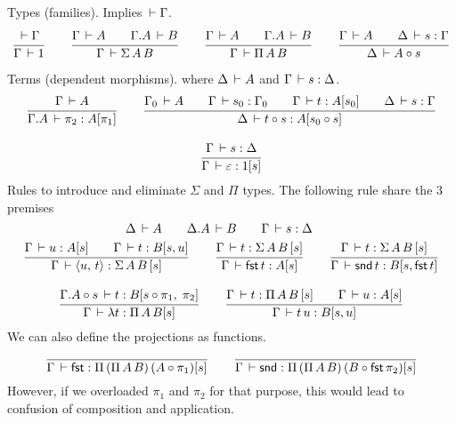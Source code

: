 \documentclass{article}
\newcommand{\pair}[2]{\langle#1,\,#2\rangle}
\newcommand{\eps}{\varepsilon}
\newcommand{\emp}{\eps}
\newcommand{\SigT}[2]{\Sigma\,#1\,#2}
\renewcommand{\PiT}[2]{\Pi\,#1\,#2}
\begin{document}
Types (families).   Implies $\,\vdash \Gamma$.
\begin{gather*}
  \ru{\der \Gamma
    }{\Gamma \der 1}
\qquad
  \ru{\Gamma \der A \qquad
      \cext \Gamma A \der B
    }{\Gamma \der \SigT A B}
\qquad
  \ru{\Gamma \der A \qquad
      \cext \Gamma A \der B
    }{\Gamma \der \PiT A B}
\qquad
  \ru{\Gamma \der A \qquad \Delta \der s : \Gamma
    }{\Delta \der A \comp s}
\end{gather*}

Terms (dependent morphisms).  where
$\Delta \,\vdash A$ and $\Gamma \,\vdash s : \Delta$.
\begin{gather*}
  \ru{\Gamma \der A
    }{\cext \Gamma A \der \pi_2 : A [\pi_1]}
\qquad
  \ru{\Gamma_0 \der A \qquad
      \Gamma \der s_0 : \Gamma_0 \qquad
      \Gamma \der t : A[s_0]   \qquad
      \Delta \der s : \Gamma
    }{\Delta \der t \comp s : A[s_0 \comp s]}
\\[2ex]
  \ru{\Gamma \der s : \Delta
    }{\Gamma \der \emp : 1 [s]}
\end{gather*}
Rules to introduce and eliminate $\Sigma$ and $\Pi$ types.
The following rule share the 3 premises
\[
      \Delta \,\vdash A \qquad
      \Delta. A \,\vdash B \qquad
      \Gamma \,\vdash s : \Delta \qquad
\]
\begin{gather*}
  \ru{%
      \Gamma \der u : A [s]\qquad
      \Gamma \der t : B [s , u]
    }{\Gamma \der \pair u t : \SigT A B \,[s]}
\qquad
  \ru{%
      \Gamma \der t : \SigT A B \,[s]
    }{\Gamma \der \tfst\, t : A [s]}
\qquad
  \ru{%
      \Gamma \der t : \SigT A B \,[s]
    }{\Gamma \der \tsnd\, t : B [s , \tfst\, t]}
\\[2ex]
  \ru{%
      \cext \Gamma {A \comp s} \der t : B [s \comp \pi_1,\; \pi_2]
    }{\Gamma \der \lambda t : \PiT A B [s]}
\qquad
  \ru{%
      \Gamma \der t : \piT A B \,[s] \qquad
      \Gamma \der u : A [s]
    }{\Gamma \der t\,u : B[s, u]}
\end{gather*}
We can also define the projections as functions.
\begin{gather*}
  \ru{
    }{\Gamma \der \tfst : \PiT {(\PiT A B)} {(A \comp \pi_1)} [s]}
\qquad
  \ru{
    }{\Gamma \der \tsnd : \PiT {(\PiT A B)} {(B \comp \tfst\,\pi_2)} [s]}
\end{gather*}
However, if we overloaded $\pi_1$ and $\pi_2$ for that purpose, this would
lead to confusion of composition and application.
\end{document}
